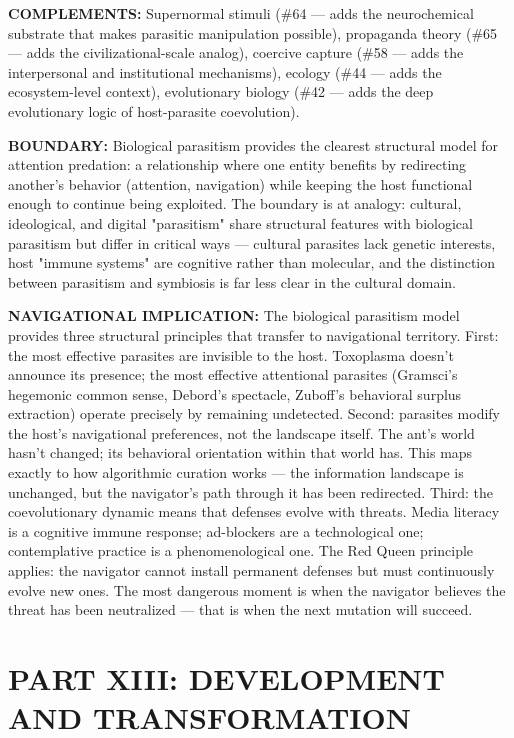 \textbf{COMPLEMENTS:} Supernormal stimuli (\#64 — adds the neurochemical substrate that makes parasitic manipulation possible), propaganda theory (\#65 — adds the civilizational-scale analog), coercive capture (\#58 — adds the interpersonal and institutional mechanisms), ecology (\#44 — adds the ecosystem-level context), evolutionary biology (\#42 — adds the deep evolutionary logic of host-parasite coevolution).


\textbf{BOUNDARY:} Biological parasitism provides the clearest structural model for attention predation: a relationship where one entity benefits by redirecting another's behavior (attention, navigation) while keeping the host functional enough to continue being exploited. The boundary is at analogy: cultural, ideological, and digital "parasitism" share structural features with biological parasitism but differ in critical ways — cultural parasites lack genetic interests, host "immune systems" are cognitive rather than molecular, and the distinction between parasitism and symbiosis is far less clear in the cultural domain.


\textbf{NAVIGATIONAL IMPLICATION:} The biological parasitism model provides three structural principles that transfer to navigational territory. First: the most effective parasites are invisible to the host. Toxoplasma doesn't announce its presence; the most effective attentional parasites (Gramsci's hegemonic common sense, Debord's spectacle, Zuboff's behavioral surplus extraction) operate precisely by remaining undetected. Second: parasites modify the host's navigational preferences, not the landscape itself. The ant's world hasn't changed; its behavioral orientation within that world has. This maps exactly to how algorithmic curation works — the information landscape is unchanged, but the navigator's path through it has been redirected. Third: the coevolutionary dynamic means that defenses evolve with threats. Media literacy is a cognitive immune response; ad-blockers are a technological one; contemplative practice is a phenomenological one. The Red Queen principle applies: the navigator cannot install permanent defenses but must continuously evolve new ones. The most dangerous moment is when the navigator believes the threat has been neutralized — that is when the next mutation will succeed.


\bigskip\noindent\makebox[\textwidth]{\color{rulegray}\rule{5cm}{0.3pt}}\bigskip


\chapter*{PART XIII: DEVELOPMENT AND TRANSFORMATION}



